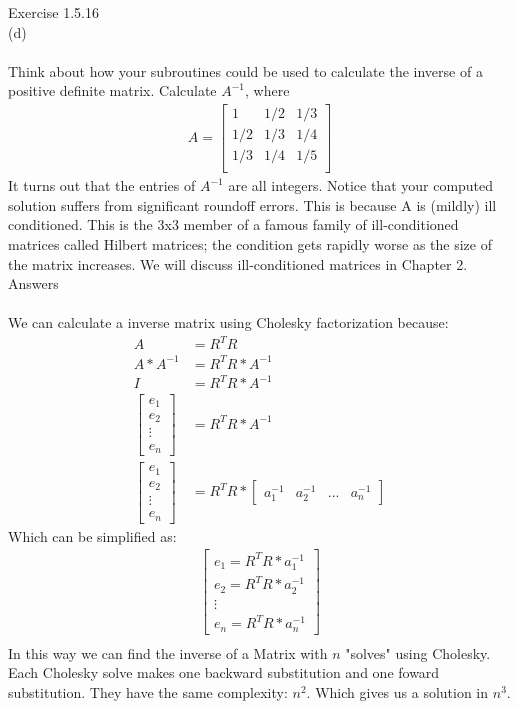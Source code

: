 \documentclass{article}
\begin{document}
	Exercise 1.5.16\\
	(d)\\
	\\
	Think about how your subroutines could be used to calculate the inverse of a 
	positive definite matrix. Calculate $A^{-1}$, where 
	\begin{align*}
	A = \begin{bmatrix}
	1 & 1/2 & 1/3 \\
	1/2 & 1/3 & 1/4\\ 
	1/3 & 1/4 & 1/5\\ 
	\end{bmatrix}	
	\end{align*}
	It turns out that the entries of $A^{-1}$ are all integers. Notice that your computed 
	solution suffers from significant roundoff errors. This is because A is (mildly) 
	ill conditioned. This is the 3x3 member of a famous family of ill-conditioned 
	matrices called Hilbert matrices; the condition gets rapidly worse as the size 
	of the matrix increases. We will discuss ill-conditioned matrices in Chapter 2.
	\\
	Answers\\
	\\
	We can calculate a inverse matrix using Cholesky factorization because:
	\begin{align*}
		A &= R^TR\\
		A*A^{-1} &= R^TR*A^{-1}\\
		I &= R^TR*A^{-1}\\
		\begin{bmatrix}
			e_1\\e_2\\\vdots\\e_n
		\end{bmatrix} &= R^TR*A^{-1}\\
		\begin{bmatrix}
		e_1\\e_2\\\vdots\\e_n
		\end{bmatrix} &= R^TR*\begin{bmatrix}
			a^{-1}_{1} &
			a^{-1}_{2} &
			... &
			a^{-1}_{n}
		\end{bmatrix}
	\end{align*}	
	Which can be simplified as:
	\begin{align*}
		\begin{bmatrix}
			e_1 = R^TR*a^{-1}_{1}\\
			e_2 = R^TR*a^{-1}_{2}\\
			\vdots \\
			e_n = R^TR*a^{-1}_{n}
		\end{bmatrix}\\		
	\end{align*}
	In this way we can find the inverse of a Matrix with $n$ "solves" using Cholesky. Each Cholesky solve makes one backward substitution and one foward substitution. They have the same complexity: $n^2$. Which gives us a solution in $n^3$.	
\end{document}
